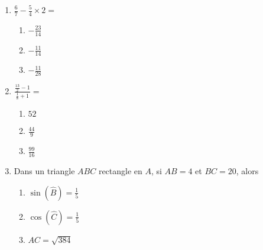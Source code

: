\documentclass[oneside,twoside]{book}
\begin{document}
\begin{enumerate}
\begin{enumerate}

\item\MauvaiseReponse $\emptyset$

\item\BonneReponse $\{5 ;-8\}$

\item\MauvaiseReponse $\{5 ; 8\}$

\end{enumerate}



\item $\frac{6}{7} - \frac{5}{4} \times2=$

\begin{enumerate}

\item\BonneReponse $-\frac{23}{14}$
\item\MauvaiseReponse $-\frac{11}{14}$

\item\MauvaiseReponse $-\frac{11}{28}$


\end{enumerate}



\item $\displaystyle\frac{\frac{13}{2}-1}{\frac{1}{8}+1}=$

\begin{enumerate}


\item\MauvaiseReponse $52$

\item\BonneReponse $\frac{44}{9}$
\item\MauvaiseReponse $\frac{99}{16}$

\end{enumerate}




\item Dans un triangle $ABC$ rectangle en $A$, si $AB=4$ et $BC=20$, alors

\begin{enumerate}

\item\MauvaiseReponse $\sin (\hat{B})=\frac{1}{5}$


\item\MauvaiseReponse $\cos (\hat{C})=\frac{1}{5}$
\item\BonneReponse $AC=\sqrt{384}$

\end{enumerate}




\end{enumerate}
\end{document}
